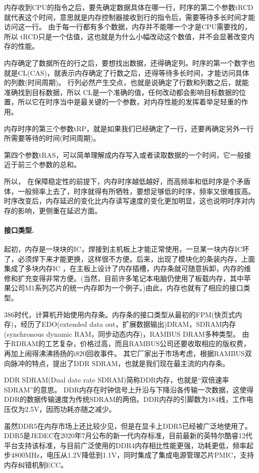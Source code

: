 \documentclass[final]{cvpr}
\newcommand{\mypara}[1]{\paragraph{#1.}}
\begin{document}
内存收到CPU的指令之后，要先确定数据具体在哪一行，时序的第二个参数tRCD就代表这个时间，意思就是内存控制器接收到行的指令后，需要等待多长时间才能访问这一行。
由于每一行都有多个数据，内存并不能哪一个才是CPU需要找的，所以 tRCD只是一个估值，这也就是为什么小幅改动这个数值，并不会显著改变内存的性能。

内存确定了数据所在的行之后，要想找出数据，还得确定列。时序的第一个数字也就是CL(CAS)，就表示内存确定了行数之后，还得等待多长时间，才能访问具体的列数(时间周期)。
行列必然产生交点，也就是说确定了行数和列数之后，就能准确找到目标数据，所以 CL是一个准确的值，任何改动都会影响目标数据的位置，所以它在时序当中是最关键的一个参数，对内存性能的发挥着举足轻重的作用。

内存时序的第三个参数tRP，就是如果我们已经确定了一行，还要再确定另外一行所需要等待的时间(时间周期)。

第四个参数tRAS，可以简单理解成内存写入或者读取数据的一个时间，它一般接近于前三个参数的总和。

所以， 在保障稳定性的前提下，内存时序越低越好，而高频率和低时序是个矛盾体，一般频率上去了，时序就得有所牺牲，要想足够低的时序，频率又很难拔高。
时序改变后，内存延迟的变化比内存读写速度的变化更加明显，这也说明时序对内存的影响，更侧重在延迟方面。

\mypara{接口类型}

起初，内存是一块块的IC，焊接到主机板上才能正常使用，一旦某一块内存IC坏了，必须焊下来才能更换，这样很不方便。后来，出现了模块化的条装内存，上面集成了多块内存IC ，在主板上设计了内存插槽，内存条就可随意拆卸，内存的维修和扩充变得非常方便。(当然，目前许多笔记本电脑仍使用了板载内存，其中苹果公司M1系列芯片的统一内存即为一个例子。)由此，内存也就有了相应的接口类型。

386时代，计算机开始使用内存条。内存条的接口类型从最初的FPM(快页式内存)，经历了EDO(extended data out，扩展数据输出)DRAM，SDRAM内存(synchronous dynamic RAM，同步动态内存)，RAMBUS DRAM多种类型。
由于RDRAM的工艺复杂，价格过高，而且RAMBUS公司还要收取相应的版权费，再加上闹得沸沸扬扬的i820回收事件。
其它厂家出于市场考虑，根据RAMBUS双向脉冲的特点，提出了DDR SDRAM，也就是我们现在最主流的内存条。

DDR SDRAM(Dual date rate SDRAM)简称DDR内存，也就是“双倍速率SDRAM”的意思。
DDR内存在时钟信号上升沿与下降沿各传输一次数据，这使得DDR的数据传输速度为传统SDRAM的两倍。DDR内存的引脚数为184线，工作电压仅为2.5V，因而功耗亦随之减少。

虽然DDR5在内存市场上还比较少见，但是在显卡上DDR5已经被广泛地使用了。DDR5是JEDEC在2020年7月公布的新一代内存标准，目前最新的英特尔酷睿12代平台支持该标准，与目前广泛使用的DDR4内存相比性能更强，功耗更低，频率起步4800MHz，电压从1.2V降低到1.1V，同时集成了集成电源管理芯片PMIC，支持内存纠错机制ECC。\cite{Web/jedec}
\end{document}
